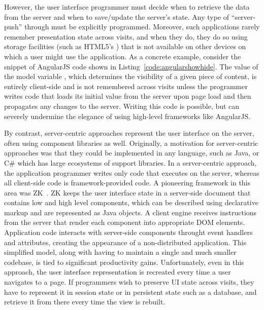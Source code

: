 
However, the user interface programmer must decide when to retrieve the data
from the server and when to save/update the server's state.  Any type of ``server-push''
through must be explicitly programmed.  Moreover, such applications
rarely remember presentation state across visits, and when they do, they do so 
using storage facilities (such as HTML5's ) that is not 
available on other devices on which a user might use the application.
As a concrete example, consider the snippet of AngularJS code shown in
Listing~\ref{code:angularshowhide}. The value of the model variable ,
which determines the visibility of a given piece of content, is entirely
client-side and is not remembered across visits unless the programmer writes
code that loads its initial value from the server upon page load and then 
propagates any changes to the server.  Writing this code is possible, but can 
severely undermine the elegance of using high-level frameworks like AngularJS.

By contrast, server-centric approaches represent the user interface on
the server, often using component libraries as well.  Originally, a motivation
for server-centric approaches was that they could be implemented in any language,
such as Java, or C\# which has large ecosystems of support libraries.
In a server-centric approach, the application programmer writes only code
that executes on the server, whereas all client-side code is framework-provided
code.  A pioneering framework in this area was ZK~\cite{ChenCheng:book2007}.
ZK keeps the user interface state in a server-side document that contains
low and high level components, which can be described using declarative
markup and are represented as Java objects.
A client engine receives instructions from the server that render each 
component into appropriate DOM elements.  Application code interacts
with server-side components throught event handlers and attributes, 
creating the appearance of a non-distributed application.  This simplified
model, along with having to maintain a single and much smaller codebase,
is tied to significant productivity gains.
Unfortunately, even in this approach, the user interface representation 
is recreated every time a user navigates to a page.  If programmers wish to
preserve UI state across visits, they have to represent it in session state
or in persistent state such as a database, and retrieve it from there every 
time the view is rebuilt.

